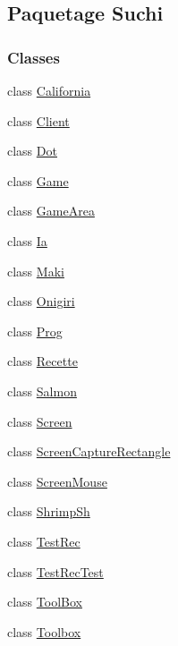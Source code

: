 \hypertarget{namespaceSuchi}{}\subsection{Paquetage Suchi}
\label{namespaceSuchi}
\subsubsection*{Classes}
\begin{DoxyCompactItemize}
\item 
class \hyperlink{classSuchi_1_1California}{California}
\item 
class \hyperlink{classSuchi_1_1Client}{Client}
\item 
class \hyperlink{classSuchi_1_1Dot}{Dot}
\item 
class \hyperlink{classSuchi_1_1Game}{Game}
\item 
class \hyperlink{classSuchi_1_1GameArea}{Game\+Area}
\item 
class \hyperlink{classSuchi_1_1Ia}{Ia}
\item 
class \hyperlink{classSuchi_1_1Maki}{Maki}
\item 
class \hyperlink{classSuchi_1_1Onigiri}{Onigiri}
\item 
class \hyperlink{classSuchi_1_1Prog}{Prog}
\item 
class \hyperlink{classSuchi_1_1Recette}{Recette}
\item 
class \hyperlink{classSuchi_1_1Salmon}{Salmon}
\item 
class \hyperlink{classSuchi_1_1Screen}{Screen}
\item 
class \hyperlink{classSuchi_1_1ScreenCaptureRectangle}{Screen\+Capture\+Rectangle}
\item 
class \hyperlink{classSuchi_1_1ScreenMouse}{Screen\+Mouse}
\item 
class \hyperlink{classSuchi_1_1ShrimpSh}{Shrimp\+Sh}
\item 
class \hyperlink{classSuchi_1_1TestRec}{Test\+Rec}
\item 
class \hyperlink{classSuchi_1_1TestRecTest}{Test\+Rec\+Test}
\item 
class \hyperlink{classSuchi_1_1ToolBox}{Tool\+Box}
\item 
class \hyperlink{classSuchi_1_1Toolbox}{Toolbox}
\end{DoxyCompactItemize}
